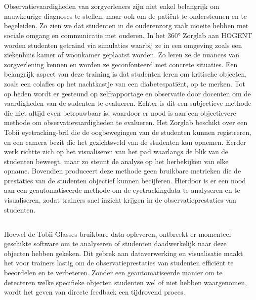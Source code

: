 
\chapter{}%
\label{ch:inleiding}

Observatievaardigheden van zorgverleners zijn niet enkel belangrijk om nauwkeurige diagnoses te stellen, maar ook om de patiënt te ondersteunen en te begeleiden. 
Zo zien we dat studenten in de ouderenzorg vaak moeite hebben met sociale omgang en communicatie met ouderen. 
In het 360° Zorglab aan HOGENT worden studenten getraind via simulaties waarbij ze in een omgeving zoals een ziekenhuis kamer of woonkamer geplaatst worden.
Zo leren ze de nuances van zorgverlening kennen en worden ze geconfonteerd met concrete situaties. 
Een belangrijk aspect van deze training is dat studenten leren om kritische objecten, zoals een colafles op het nachtkastje van een diabetespatiënt, op te merken.
Tot op heden wordt er gesteund op zelfrapportage en observatie door docenten om de vaardigheden van de sudenten te evalueren.
Echter is dit een subjectieve methode die niet altijd even betrouwbaar is, waardoor er nood is aan een objectievere methode om observatievaardigheden te evalueren.
Het Zorglab beschikt over een Tobii eyetracking-bril die de oogbewegingen van de studenten kunnen registreren, en een camera bezit die het gezichtsveld van de studenten kan opnemen.
Eerder werk richtte zich op het visualiseren van het pad waarlangs de blik van de studenten beweegt, maar zo steunt de analyse op het herbekijken van elke opname.
Bovendien produceert deze methode geen bruikbare metrieken die de prestaties van de studenten objectief kunnen becijferen.
Hierdoor is er een nood aan een geautomatiseerde methode om de eyetrackingdata te analyseren en te visualiseren, zodat trainers snel inzicht krijgen in de observatieprestaties van studenten.

\section{}%
\label{sec:probleemstelling}

Hoewel de Tobii Glasses bruikbare data opleveren, ontbreekt er momenteel geschikte software om te analyseren of studenten daadwerkelijk naar deze objecten hebben gekeken.
Dit gebrek aan dataverwerking en visualisatie maakt het voor trainers lastig om de observatieprestaties van studenten efficiënt te beeordelen en te verbeteren.
Zonder een geautomatiseerde manier om te detecteren welke specifieke objecten studenten wel of niet hebben waargenomen, wordt het geven van directe feedback een tijdrovend proces. 

